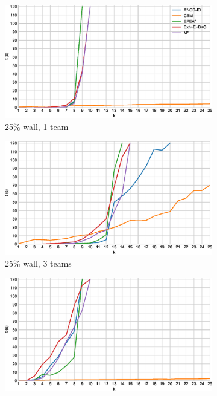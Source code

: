 \documentclass[english]{article}
\newcommand\graphwidth{0.49\textwidth}
\begin{document}
	\begin{figure}[b]
		\centering
		\begin{subfigure}{\graphwidth}
			\centering
			\includegraphics[width=\linewidth]{img/results/relative-comparison/25-1}
			\caption{25\% wall, 1 team}
			\label{fig:r-25-1}
		\end{subfigure}
		\begin{subfigure}{\graphwidth}
			\centering
			\includegraphics[width=\linewidth]{img/results/relative-comparison/25-3}
			\caption{25\% wall, 3 teams}
			\label{fig:r-25-3}
		\end{subfigure}
		\begin{subfigure}{\graphwidth}
			\centering
			\includegraphics[width=\linewidth]{img/results/relative-comparison/75-1}

\end{subfigure}
\end{figure}
\end{document}
